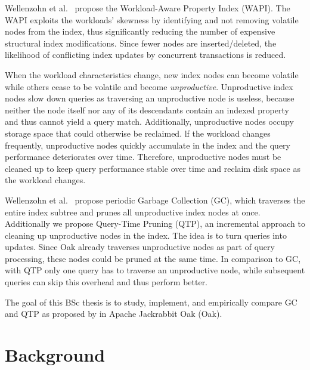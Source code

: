 \documentclass[abstracton,12pt]{scrartcl}
\theoremstyle{definition}
\begin{document}
Wellenzohn et al.~\cite{KW17} propose the Workload-Aware Property Index (WAPI). 
The WAPI exploits the workloads' skewness by identifying and not removing volatile nodes from the index, 
thus significantly reducing the number of expensive structural index modifications.
Since fewer nodes are inserted/deleted, the likelihood of conflicting index updates by concurrent transactions is reduced.

When the workload characteristics change, new index nodes can become volatile while others cease to be volatile and become \textit{unproductive}. Unproductive index nodes slow down queries as traversing an unproductive node is useless, because neither the node itself nor any of its descendants contain an indexed property and thus cannot yield a query match. Additionally, unproductive nodes occupy storage space that could otherwise be reclaimed. lf the workload changes frequently, unproductive nodes quickly accumulate in the index and the query performance deteriorates over time. Therefore, unproductive nodes must be cleaned up to keep query performance stable over time and reclaim disk space as the workload changes.

Wellenzohn et al.~\cite{KW17} propose periodic Garbage Collection (GC), which traverses the entire index subtree and prunes all unproductive index nodes at once.
Additionally we propose Query-Time Pruning (QTP), an incremental approach to cleaning up unproductive nodes in the index. The idea is to turn queries into updates. Since Oak already traverses unproductive nodes as part of query processing, these nodes could be pruned at the same time. In comparison to GC, with QTP only one query has to traverse an unproductive node, while subsequent queries can skip this overhead and thus perform better.

The goal of this BSc thesis is to study, implement, and empirically compare GC and QTP as proposed by \cite{KW17} in Apache Jackrabbit Oak (Oak).


\section{Background}
\end{document}
